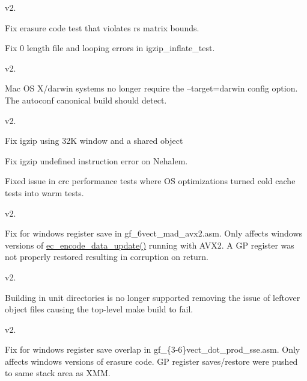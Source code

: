 v2.


\begin{DoxyItemize}
\item Fix erasure code test that violates rs matrix bounds.
\item Fix 0 length file and looping errors in igzip\-\_\-inflate\-\_\-test.
\end{DoxyItemize}

v2.


\begin{DoxyItemize}
\item Mac O\-S X/darwin systems no longer require the --target=darwin config option. The autoconf canonical build should detect.
\end{DoxyItemize}

v2.


\begin{DoxyItemize}
\item Fix igzip using 32\-K window and a shared object
\item Fix igzip undefined instruction error on Nehalem.
\item Fixed issue in crc performance tests where O\-S optimizations turned cold cache tests into warm tests.
\end{DoxyItemize}

v2.


\begin{DoxyItemize}
\item Fix for windows register save in gf\-\_\-6vect\-\_\-mad\-\_\-avx2.\-asm. Only affects windows versions of \hyperlink{erasure__code_8h_a0fa4553065d7e00c1984621e7e1af9ae}{ec\-\_\-encode\-\_\-data\-\_\-update()} running with A\-V\-X2. A G\-P register was not properly restored resulting in corruption on return.
\end{DoxyItemize}

v2.


\begin{DoxyItemize}
\item Building in unit directories is no longer supported removing the issue of leftover object files causing the top-\/level make build to fail.
\end{DoxyItemize}

v2.


\begin{DoxyItemize}
\item Fix for windows register save overlap in gf\-\_\-\{3-\/6\}vect\-\_\-dot\-\_\-prod\-\_\-sse.\-asm. Only affects windows versions of erasure code. G\-P register saves/restore were pushed to same stack area as X\-M\-M.
\end{DoxyItemize}

